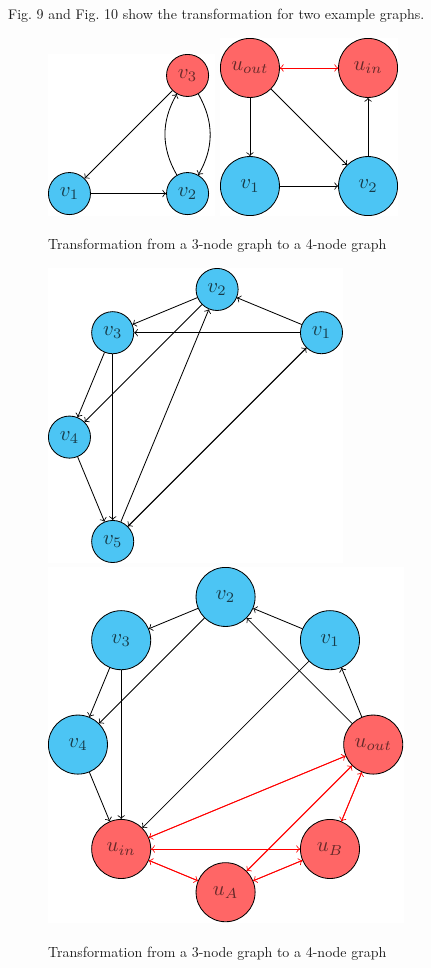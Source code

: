 \documentclass[10pt,a4paper]{article}
\begin{document}
Fig. 9 and Fig. 10 show the transformation for two example graphs.

\begin{figure}[hbtp]
\centering
\includegraphics[scale=1]{figures/three_graph.pdf}
\includegraphics[scale=1]{figures/three_to_four.pdf}
\caption{Transformation from a 3-node graph to a 4-node graph}
\end{figure}

\begin{figure}[hbtp]
\centering
\includegraphics[scale=0.9]{figures/five_graph.pdf}
\includegraphics[scale=0.78]{figures/five_to_eight.pdf}
\caption{Transformation from a 3-node graph to a 4-node graph}
\end{figure}
\end{document}
